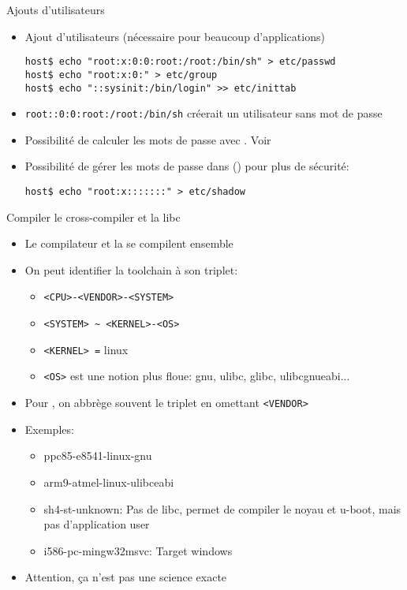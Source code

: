 \begin{frame}[fragile=singleslide]{Ajouts d'utilisateurs}
  \begin{itemize}
  \item Ajout d'utilisateurs  (nécessaire pour beaucoup d'applications)
    \begin{lstlisting}
host$ echo "root:x:0:0:root:/root:/bin/sh" > etc/passwd
host$ echo "root:x:0:" > etc/group
host$ echo "::sysinit:/bin/login" >> etc/inittab
    \end{lstlisting}
  \item  \verb'root::0:0:root:/root:/bin/sh'  créerait un  utilisateur
    sans mot de passe
  \item Possibilité de calculer les mots de passe avec . Voir
     \item Possibilité de gérer les mots de passe dans
     () pour plus de sécurité:
    \begin{lstlisting}
host$ echo "root:x:::::::" > etc/shadow
    \end{lstlisting}
  \end{itemize}
\end{frame}

\begin{frame}[fragile=singleslide]{Compiler le cross-compiler et la libc}
  \begin{itemize}
  \item Le compilateur et la  se compilent ensemble
  \item On peut identifier la toolchain à son triplet:
    \begin{itemize}
    \item \verb+<CPU>-<VENDOR>-<SYSTEM>+
    \item \verb+<SYSTEM> ~ <KERNEL>-<OS>+
    \item \verb+<KERNEL> =+ linux
    \item \verb+<OS>+  est une notion  plus floue: gnu,  ulibc, glibc,
      ulibcgnueabi...
    \end{itemize}
  \item  Pour ,  on abbrège  souvent le  triplet  en omettant
    \verb+<VENDOR>+
  \item Exemples:
    \begin{itemize}
    \item ppc85-e8541-linux-gnu %
    \item arm9-atmel-linux-ulibceabi %
    \item sh4-st-unknown: Pas de libc, permet de compiler le noyau
      et u-boot, mais pas d'application user
    \item i586-pc-mingw32msvc: Target windows
    \end{itemize}
  \item Attention, ça n'est pas une science exacte
  \end{itemize}
\end{frame}

